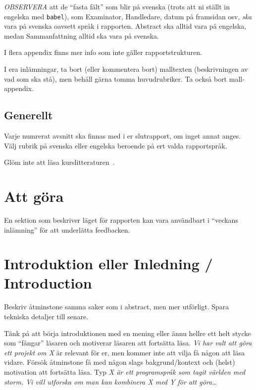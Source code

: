 \documentclass[a4paper,12pt]{article}
\begin{document}
\emph{OBSERVERA} att de ``fasta fält'' som blir på svenska (trots att ni ställt in engelska med \texttt{babel}), som Examinator, Handledare, datum på framsidan osv, \emph{ska} vara på svenska oavsett språk i rapporten. Abstract ska alltid vara på engelska, medan Sammanfattning alltid ska vara på svenska.

I flera appendix finns mer info som inte gäller rapportstrukturen.

I era inlämningar, ta bort (eller kommentera bort) malltexten (beskrivningen av vad som ska stå), men behåll gärna tomma huvudrubriker. Ta också bort mall-appendix.

\subsection*{Generellt}
Varje numrerat avsnitt ska finnas med i er slutrapport, om inget annat anges.
Välj rubrik på svenska eller engelska beroende på ert valda rapportspråk.

Glöm inte att läsa kurslitteraturen~\cite{dawson:projects-in-computing,dawson:projects-in-computing-old}.




\section*{Att göra}
En sektion som beskriver läget för rapporten kan vara användbart i ``veckans inlämning'' för att underlätta feedbacken.

\newpage %

\section{Introduktion eller Inledning / Introduction}
Beskriv åtminstone samma saker som i abstract, men mer utförligt. Spara tekniska detaljer till senare.

Tänk på att börja introduktionen med en mening eller ännu hellre ett helt stycke som ``fångar'' läsaren och motiverar läsaren att fortsätta läsa.  \emph{Vi har valt att göra ett projekt om X} är relevant för er, men kommer inte att vilja få någon att läsa vidare.  Försök åtminstone få med någon slags bakgrund/kontext och (helst) motivation att fortsätta läsa.  Typ \emph{X är ett programspråk som tagit världen med storm.  Vi vill utforska om man kan kombinera X med Y för att göra\ldots}
\end{document}
